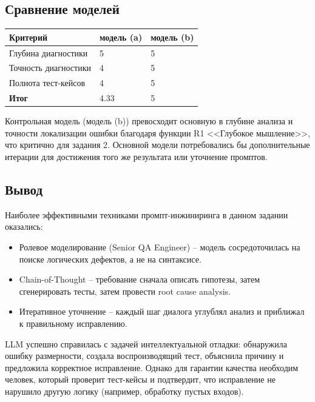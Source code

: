\subsection{Сравнение моделей}
\begin{table}[h!]
	\centering
	\begin{tabular}{|l|p{5cm}|p{5cm}|}
		\hline
		\textbf{Критерий} & \textbf{модель (a)} & \textbf{модель (b)} \\
		\hline
		Глубина диагностики & 5 & 5 \\
		\hline
		Точность диагностики & 4 & 5 \\
		\hline
		Полнота тест-кейсов & 4 & 5 \\
		\hline
		\textbf{Итог} & 4.33 & 5\\
		\hline
	\end{tabular}
\end{table} 
Контрольная модель (модель (b)) превосходит основную
в глубине анализа и точности локализации ошибки благодаря функции R1 <<Глубокое мышление>>, 
что критично для задания 2. Основной модели потребовались бы дополнительные итерации для достижения того же результата или уточнение промптов.
\subsection{Вывод}
Наиболее эффективными техниками промпт-инжиниринга в данном задании оказались:
\begin{itemize}
	\item Ролевое моделирование (Senior QA Engineer) – модель сосредоточилась на поиске логических дефектов, а не на синтаксисе.
	\item Chain-of-Thought – требование сначала описать гипотезы, затем сгенерировать тесты, затем провести root cause analysis.
	\item Итеративное уточнение – каждый шаг диалога углублял анализ и приближал к правильному исправлению.
\end{itemize}
LLM успешно справилась с задачей интеллектуальной отладки: обнаружила ошибку размерности, создала воспроизводящий тест, объяснила причину и предложила корректное исправление. Однако для гарантии качества необходим человек, который проверит тест-кейсы и подтвердит, что исправление не нарушило другую логику (например, обработку пустых входов).
